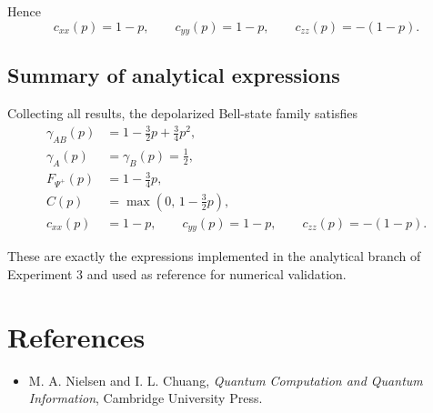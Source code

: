 \documentclass[a4paper]{article}
\begin{document}
Hence
\[
c_{xx}(p)=1-p,
\qquad
c_{yy}(p)=1-p,
\qquad
c_{zz}(p)=-(1-p).
\]


\subsection*{Summary of analytical expressions}

Collecting all results, the depolarized Bell-state family satisfies
\[
\boxed{
\begin{aligned}
\gamma_{AB}(p) &= 1-\frac{3}{2}p+\frac{3}{4}p^2, \\
\gamma_A(p) &= \gamma_B(p)=\frac12, \\
F_{\Psi^+}(p) &= 1-\frac34 p, \\
C(p) &= \max\left(0,\,1-\frac32 p\right), \\
c_{xx}(p) &= 1-p,\qquad c_{yy}(p)=1-p,\qquad c_{zz}(p)=-(1-p).
\end{aligned}
}
\]

These are exactly the expressions implemented in the analytical branch of Experiment 3 and used as reference for numerical validation.

\section{References}

\begin{itemize}
    \item M. A. Nielsen and I. L. Chuang, \textit{Quantum Computation and Quantum Information}, Cambridge University Press.
\end{itemize}
\end{document}

